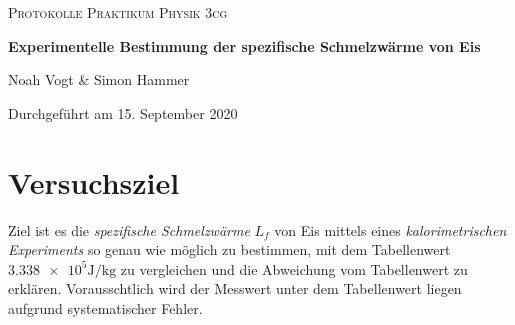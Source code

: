 \documentclass[a4paper,12pt]{article}
\begin{document}
\begin{titlepage}

\vspace*{1cm}
	\centering
	
	{\scshape\Large Protokolle Praktikum Physik 3cg \par}
	\vspace{0.5cm}
	{\huge\bfseries Experimentelle Bestimmung der spezifische Schmelzwärme von Eis\par}
	\vspace{0.5cm}
	{\Large Noah Vogt \& Simon Hammer\par}
	\vspace{0.5cm}

	{\large Durchgeführt am 15. September 2020\par}
	
\end{titlepage}

\tableofcontents
\pagebreak

\section{Versuchsziel}
Ziel ist es die \textit{spezifische Schmelzwärme} $L_f$ von Eis mittels eines \textit{kalorimetrischen Experiments} so genau wie möglich zu bestimmen, mit dem Tabellenwert $\num{3.338 e5}\si{\J\per\kg}$ \cite{formelsammlung} zu vergleichen und die Abweichung vom Tabellenwert zu erklären. Vorausschtlich wird der Messwert unter dem Tabellenwert liegen aufgrund systematischer Fehler.
\end{document}
